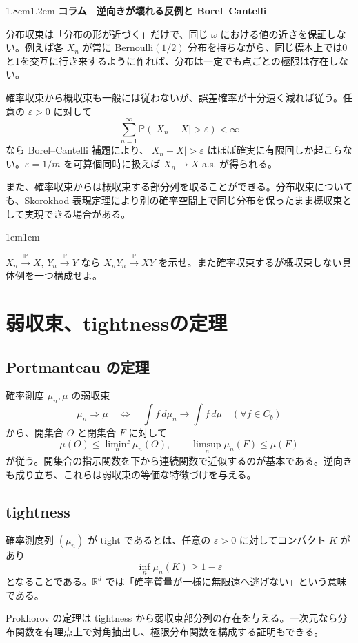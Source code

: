 \documentclass[a4paper,11pt,pdflatex,ja=standard,jafont=ipaex-type1,
  magstyle=real,scale=1]{bxjsarticle}
\theoremstyle{definition}
\theoremstyle{remark}
\newenvironment{columnnote}[1]
{\par\medskip\begin{adjustwidth}{1.8em}{1.2em}\small\sffamily\color{ColumnText}
{\large\bfseries\color{Accent}コラム　#1}\par\vspace{0.25em}{\color{Accent}\hrule height 0.7pt}\vspace{0.65em}}
{\par\vspace{0.45em}{\color{Accent}\hrule height 0.3pt}\end{adjustwidth}\medskip}
\newenvironment{exerciseblock}
{\par\medskip\begin{adjustwidth}{1em}{1em}\small\sffamily{\bfseries\color{SoftGray}演習・補足}\par\vspace{0.2em}}
{\end{adjustwidth}\medskip}
\newcommand{\Pp}{\mathbb P}
\newcommand{\R}{\mathbb R}
\newcommand{\1}{\mathbf 1}
\begin{document}
\begin{columnnote}{逆向きが壊れる反例と Borel--Cantelli}
分布収束は「分布の形が近づく」だけで、同じ $\omega$ における値の近さを保証しない。例えば各 $X_n$ が常に Bernoulli$(1/2)$ 分布を持ちながら、同じ標本上では0と1を交互に行き来するように作れば、分布は一定でも点ごとの極限は存在しない。

確率収束から概収束も一般には従わないが、誤差確率が十分速く減れば従う。任意の $\varepsilon>0$ に対して
\[
\sum_{n=1}^\infty \Pp(|X_n-X|>\varepsilon)<\infty
\]
なら Borel--Cantelli 補題により、$|X_n-X|>\varepsilon$ はほぼ確実に有限回しか起こらない。$\varepsilon=1/m$ を可算個同時に扱えば $X_n\to X$ a.s. が得られる。

また、確率収束からは概収束する部分列を取ることができる。分布収束についても、Skorokhod 表現定理により別の確率空間上で同じ分布を保ったまま概収束として実現できる場合がある。
\end{columnnote}

\begin{exerciseblock}
$X_n\xrightarrow{\Pp}X$, $Y_n\xrightarrow{\Pp}Y$ なら $X_nY_n\xrightarrow{\Pp}XY$ を示せ。また確率収束するが概収束しない具体例を一つ構成せよ。
\end{exerciseblock}

\section{弱収束、tightnessの定理}
\subsection{Portmanteau の定理}
確率測度 $\mu_n,\mu$ の弱収束
\[
\mu_n\Rightarrow\mu
\quad\Longleftrightarrow\quad
\int f\,d\mu_n\to\int f\,d\mu
\quad(\forall f\in C_b)
\]
から、開集合 $O$ と閉集合 $F$ に対して
\[
\mu(O)\le\liminf_n\mu_n(O),
\qquad
\limsup_n\mu_n(F)\le\mu(F)
\]
が従う。開集合の指示関数を下から連続関数で近似するのが基本である。逆向きも成り立ち、これらは弱収束の等価な特徴づけを与える。

\subsection{tightness}
確率測度列 $(\mu_n)$ が tight であるとは、任意の $\varepsilon>0$ に対してコンパクト $K$ があり
\[
\inf_n\mu_n(K)\ge1-\varepsilon
\]
となることである。$\R^d$ では「確率質量が一様に無限遠へ逃げない」という意味である。

Prokhorov の定理は tightness から弱収束部分列の存在を与える。一次元なら分布関数を有理点上で対角抽出し、極限分布関数を構成する証明もできる。
\end{document}
